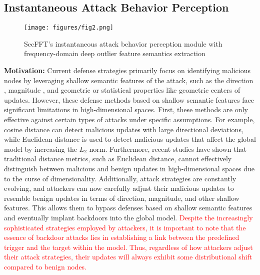 \documentclass[lettersize,journal]{IEEEtran}
\begin{document}
\subsection{Instantaneous Attack Behavior Perception}
\begin{figure}[!t]
    \centering
    \texttt{[image: figures/fig2.png]}
    \caption{SecFFT's instantaneous attack behavior perception module with frequency-domain deep outlier feature semantics extraction}
    \label{fig2:instant}
\end{figure}
\textbf{Motivation:} 
Current defense strategies primarily focus on identifying malicious nodes by leveraging shallow semantic features of the attack, such as the direction \cite{foolsgold}, magnitude \cite{sun2019can}, and geometric or statistical properties like geometric centers \cite{pillutla2022robust} of updates. However, these defense methods based on shallow semantic features face significant limitations in high-dimensional spaces. First, these methods are only effective against certain types of attacks under specific assumptions. For example, cosine distance can detect malicious updates with large directional deviations, while Euclidean distance is used to detect malicious updates that affect the global model by increasing the $L_2$ norm. Furthermore, recent studies \cite{huang2023multi} have shown that traditional distance metrics, such as Euclidean distance, cannot effectively distinguish between malicious and benign updates in high-dimensional spaces due to the curse of dimensionality. Additionally, attack strategies are constantly evolving, and attackers can now carefully adjust their malicious updates to resemble benign updates in terms of direction, magnitude, and other shallow features. This allows them to bypass defenses based on shallow semantic features and eventually implant backdoors into the global model. \textcolor{red}{Despite the increasingly sophisticated strategies employed by attackers, it is important to note that the essence of backdoor attacks lies in establishing a link between the predefined trigger and the target within the model. Thus, regardless of how attackers adjust their attack strategies, their updates will always exhibit some distributional shift compared to benign nodes.}
\end{document}
